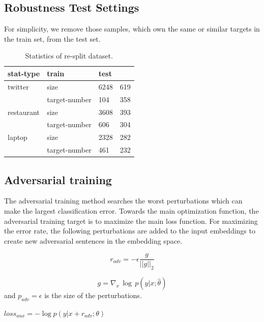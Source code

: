 \documentclass[fyp]{socreport}
\begin{document}
\subsection{Robustness Test Settings}
For simplicity, we remove those samples, which own the same or similar targets in the train set, from the test set.

\begin{table}[]
    \centering
    \caption{Statistics of re-split dataset.}
    \begin{tabular}{llll}
    \hline
    stat-type  & train         & test &     \\ \hline
    twitter    & size          & 6248 & 619 \\ \hline
               & target-number & 104  & 358 \\ \hline
    restaurant & size          & 3608 & 393 \\ \hline
               & target-number & 606  & 304 \\ \hline
    laptop     & size          & 2328 & 282 \\ \hline
               & target-number & 461  & 232 \\ \hline
    \end{tabular}
\end{table}

\subsection{Adversarial training}
The adversarial training method searches the worst perturbations which can make the largest classification error. Towards the main optimization function, the adversarial training target is to maximize the main loss function. For maximizing the error rate, the following perturbations are added to the input embeddings to create new adversarial sentences in the embedding space. 

\begin{equation}
r_{adv} = -\epsilon \frac{g}{||g||_2}
\end{equation} 

\begin{equation}
    g = \nabla_{x}\, \log\,  p(y|x;\hat{\theta})
\end{equation} and $p_{adv}=\epsilon$ is the size of the perturbations.

\begin{center}
	$loss_{aux}=- \log p(y|x + r_{adv};\theta)$
\end{center}
\end{document}
